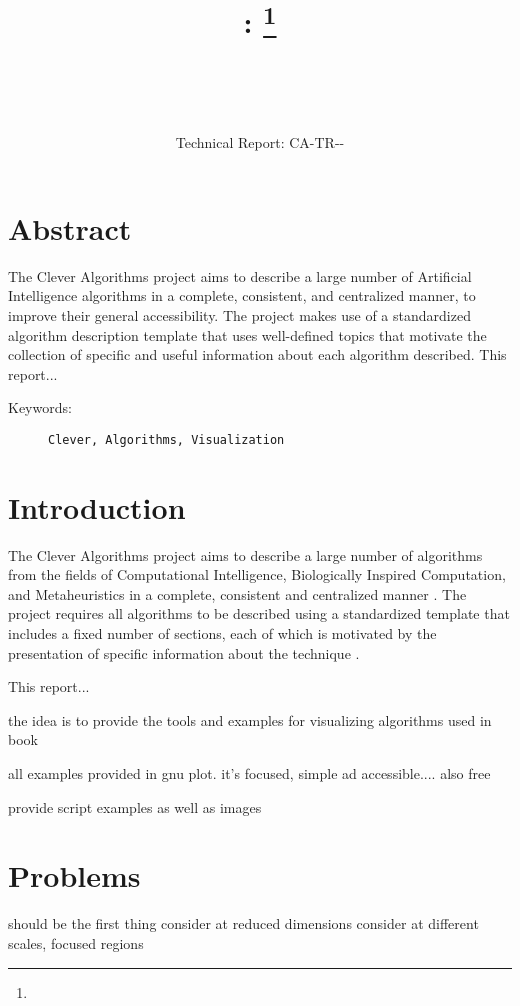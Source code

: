 \documentclass[a4paper, 11pt]{article}
\title{{\myreporttitle}: {\myreportsubtitle}\footnote{\myreportlicense}}
\author{\myreportauthor\\{\myreportemail}\\\small\myreportproject}
\date{\myreportfulldate\\{\small{Technical Report: CA-TR-{\myreportdate}-\myreportversion}}}
\begin{document}
\maketitle

\section*{Abstract} 
The Clever Algorithms project aims to describe a large number of Artificial Intelligence algorithms in a complete, consistent, and centralized manner, to improve their general accessibility. 
The project makes use of a standardized algorithm description template that uses well-defined topics that motivate the collection of specific and useful information about each algorithm described.
This report...

\begin{description}
	\item[Keywords:] {\small\texttt{Clever, Algorithms, Visualization}}
\end{description} 

\section{Introduction}
\label{sec:introduction}
The Clever Algorithms project aims to describe a large number of algorithms from the fields of Computational Intelligence, Biologically Inspired Computation, and Metaheuristics in a complete, consistent and centralized manner \cite{Brownlee2010}.
The project requires all algorithms to be described using a standardized template that includes a fixed number of sections, each of which is motivated by the presentation of specific information about the technique \cite{Brownlee2010a}.

This report...

the idea is to provide the tools and examples for visualizing algorithms used in book

all examples provided in gnu plot. it's focused, simple ad accessible.... also free

provide script examples as well as images


%
%
\section{Problems}
should be the first thing
consider at reduced dimensions
consider at different scales, focused regions
\end{document}
